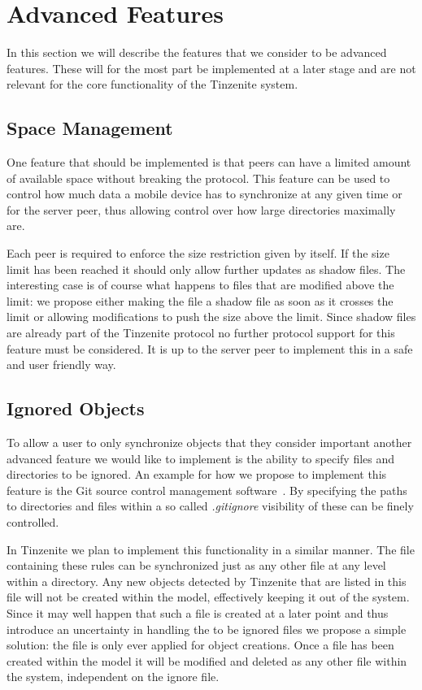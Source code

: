 \section{Advanced Features}
\label{sec:Advanced Features}

In this section we will describe the features that we consider to be advanced features.
These will for the most part be implemented at a later stage and are not relevant for the core functionality of the Tinzenite system.

\subsection{Space Management}
\label{sub:Space Management}

One feature that should be implemented is that peers can have a limited amount of available space without breaking the protocol.
This feature can be used to control how much data a mobile device has to synchronize at any given time or for the server peer, thus allowing control over how large directories maximally are.

Each peer is required to enforce the size restriction given by itself.
If the size limit has been reached it should only allow further updates as shadow files.
The interesting case is of course what happens to files that are modified above the limit: we propose either making the file a shadow file as soon as it crosses the limit or allowing modifications to push the size above the limit.
Since shadow files are already part of the Tinzenite protocol no further protocol support for this feature must be considered.
It is up to the server peer to implement this in a safe and user friendly way.

\subsection{Ignored Objects}
\label{sub:Ignored Objects}

To allow a user to only synchronize objects that they consider important another advanced feature we would like to implement is the ability to specify files and directories to be ignored.
An example for how we propose to implement this feature is the Git source control management software~\cite{web:site:git}.
By specifying the paths to directories and files within a so called \textit{.gitignore} visibility of these can be finely controlled.

In Tinzenite we plan to implement this functionality in a similar manner.
The file containing these rules can be synchronized just as any other file at any level within a directory.
Any new objects detected by Tinzenite that are listed in this file will not be created within the model, effectively keeping it out of the system.
Since it may well happen that such a file is created at a later point and thus introduce an uncertainty in handling the to be ignored files we propose a simple solution: the file is only ever applied for object creations.
Once a file has been created within the model it will be modified and deleted as any other file within the system, independent on the ignore file.

